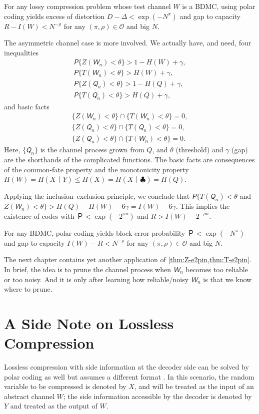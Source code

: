 \documentclass[openany]{amsbook}
\numberwithin{equation}{chapter}
\numberwithin{figure}{chapter}
\numberwithin{table}{chapter}
\theoremstyle{definition}	理dfn:Definition~?s			理exa:Example~?s
\theoremstyle{remark}		理cla:Claim~?s				理rem:Remark~?s
\begin{document}
	\begin{cor}
		For any lossy compression problem whose test channel $W$ is a BDMC,
		using polar coding yields excess of distortion $D-Δ<\exp(-N^π)$
		and gap to capacity $R-I(W)<N^{-ρ}$ for any $(π,ρ)∈𝒪$ and big $N$.
	\end{cor}
	
	The asymmetric channel case is more involved.
	We actually have, and need, four inequalities
	\begin{gather*}
		𝘗\{Z(𝘞_n)<θ\}>1-H(W)+γ,	\\
		𝘗\{T(𝘞_n)<θ\}>H(W)+γ,		\\
		𝘗\{Z(𝘘_n)<θ\}>1-H(Q)+γ,	\\
		𝘗\{T(𝘘_n)<θ\}>H(Q)+γ,		
	\end{gather*}
	and basic facts
	\begin{gather*}
		\{Z(𝘞_n)<θ\}∩\{T(𝘞_n)<θ\}=0,	\\
		\{Z(𝘘_n)<θ\}∩\{T(𝘘_n)<θ\}=0,	\\
		\{Z(𝘘_n)<θ\}∩\{T(𝘞_n)<θ\}=0.
	\end{gather*}
	Here, $\{𝘘_n\}$ is the channel process grown from $Q$, and
	$θ$ (threshold) and $γ$ (gap) are the shorthands of the complicated functions.
	The basic facts are consequences of the common-fate property
	and the monotonicity property $H(W)=H(X｜Y)≤H(X)=H(X｜♣)=H(Q)$.
	
	Applying the inclusion--exclusion principle, we conclude that
	$𝘗\{T(𝘘_n)<θ$ and $Z(𝘞_n)<θ\}>H(Q)-H(W)-6γ=I(W)-6γ$.
	This implies the existence of codes with $Ｐ<\exp(-2^{πn})$ and $R>I(W)-2^{-ρn}$.
	
	\begin{cor}
		For any BDMC, polar coding yields block error probability $Ｐ<\exp(-N^π)$
		and gap to capacity $I(W)-R<N^{-ρ}$ for any $(π,ρ)∈𝒪$ and big $N$.
	\end{cor}
	
	The next chapter contains yet another application of \cref{thm:Z-e2pin,thm:T-e2pin}.
	In brief, the idea is to prune the channel process
	when $𝘞_n$ becomes too reliable or too noisy.
	And it is only after learning how reliable/noisy
	$𝘞_n$ is that we know where to prune.

\section{A Side Note on Lossless Compression}

	Lossless compression with side information at the decoder side can be solved
	by polar coding as well but assumes a different format \cite{Arikan10,CK10}.
	In this scenario, the random variable to be compressed is denoted by $X$,
	and will be treated as the input of an abstract channel $W$;
	the side information accessible by the decoder
	is denoted by $Y$ and treated as the output of $W$.
	
\end{document}
